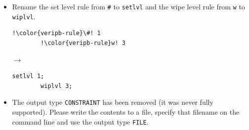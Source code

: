 \documentclass[a4paper]{article}
\newcommand{\veriPB}[0]{\textsc{VeriPB}}
\begin{document}
\begin{itemize}
	      \begin{minipage}[t]{.05\linewidth}
		      \centering \vspace*{-5mm}$\to$
	      \end{minipage}\hfill%
	      \hfill%
	      \begin{minipage}{.47\linewidth}
		      \begin{lstlisting}[language=veripb, gobble=8, rulecolor=\color{veripb-valid-text}, caption={\veriPB{} 3.0 syntax.}]
		pol 1 2 +;
		rup +1 x1 >= 0;
		del id 42;
		solx ~x1 x2 x3;
		soli ~x1 x2 x3;
		def_order
			...
		end;
		\end{lstlisting}
	      \end{minipage}
	\item Rename the set level rule from \verb!#! to \lstinline[language=veripb]!setlvl! and the wipe level rule from \verb!w! to \lstinline[language=veripb]!wiplvl!.
	      \\[1mm]
	      \begin{minipage}{.47\linewidth}
		      \begin{lstlisting}[language=veripb, gobble=8, rulecolor=\color{veripb-invalid-text}, caption={\veriPB{} 2.0 syntax.}]
		!\color{veripb-rule}\#! 1
		!\color{veripb-rule}w! 3
		\end{lstlisting}
	      \end{minipage}\hfill%
	      \begin{minipage}[t]{.05\linewidth}
		      \centering \vspace*{-5mm}$\to$
	      \end{minipage}\hfill%
	      \hfill%
	      \begin{minipage}{.47\linewidth}
		      \begin{lstlisting}[language=veripb, gobble=8, rulecolor=\color{veripb-valid-text}, caption={\veriPB{} 3.0 syntax.}]
		setlvl 1;
		wiplvl 3;
		\end{lstlisting}
	      \end{minipage}
	\item The output type {\color{veripb-constant}\verb!CONSTRAINT!} has been removed (it was never fully supported). Please write the contents to a file, specify that filename on the command line and use the output type \lstinline[language=veripb]!FILE!.
	      \\[1mm]
	      \begin{minipage}{.47\linewidth}
		      \begin{lstlisting}[language=veripb, gobble=8, rulecolor=\color{veripb-invalid-text}, caption={\veriPB{} 2.0 syntax.}]

\end{lstlisting}
\end{minipage}
\end{itemize}
\end{document}
